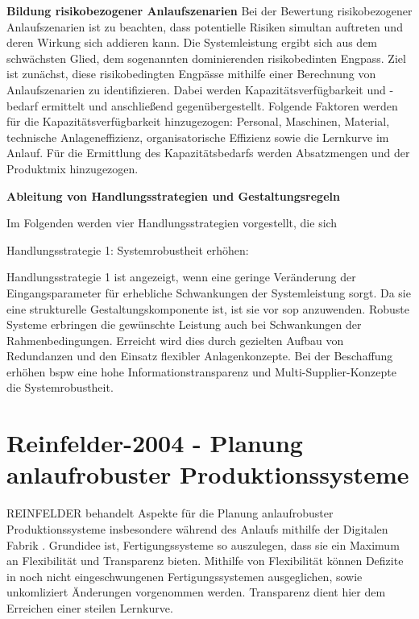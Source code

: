 \textbf{Bildung risikobezogener Anlaufszenarien}
Bei der Bewertung risikobezogener Anlaufszenarien ist zu beachten, dass potentielle Risiken simultan auftreten und deren Wirkung sich addieren kann. Die Systemleistung ergibt sich aus dem schwächsten Glied, dem sogenannten dominierenden risikobedinten Engpass. Ziel ist zunächst, diese risikobedingten Engpässe mithilfe einer Berechnung von Anlaufszenarien zu identifizieren. %
Dabei werden Kapazitätsverfügbarkeit und -bedarf ermittelt und anschließend gegenübergestellt. Folgende Faktoren werden für die Kapazitätsverfügbarkeit hinzugezogen: Personal, Maschinen, Material, technische Anlageneffizienz, organisatorische Effizienz sowie die Lernkurve im Anlauf. %
Für die Ermittlung des Kapazitätsbedarfs werden Absatzmengen und der Produktmix hinzugezogen. 

\textbf{Ableitung von Handlungsstrategien und Gestaltungsregeln}

Im Folgenden werden vier Handlungsstrategien vorgestellt, die sich%

Handlungsstrategie 1: Systemrobustheit erhöhen: 

Handlungsstrategie 1 ist angezeigt, wenn eine geringe Veränderung der Eingangsparameter für erhebliche Schwankungen der Systemleistung sorgt. Da sie eine strukturelle Gestaltungskomponente ist, ist sie vor \gls{sop} anzuwenden. 
Robuste Systeme erbringen die gewünschte Leistung auch bei Schwankungen der Rahmenbedingungen. 
Erreicht wird dies durch gezielten Aufbau von Redundanzen und den Einsatz flexibler Anlagenkonzepte.
Bei der Beschaffung erhöhen \gls{bspw} eine hohe Informationstransparenz und Multi-Supplier-Konzepte die Systemrobustheit. 

\section{Reinfelder-2004 - Planung anlaufrobuster Produktionssysteme}

REINFELDER behandelt Aspekte für die Planung anlaufrobuster Produktionssysteme insbesondere während des Anlaufs mithilfe der Digitalen Fabrik \cite{Reinfelder2004}. 
Grundidee ist, Fertigungssysteme so auszulegen, dass sie ein Maximum an Flexibilität und Transparenz bieten. Mithilfe von Flexibilität können Defizite in noch nicht eingeschwungenen Fertigungssystemen ausgeglichen, sowie unkomliziert Änderungen vorgenommen werden. Transparenz dient hier dem Erreichen einer steilen Lernkurve. 

